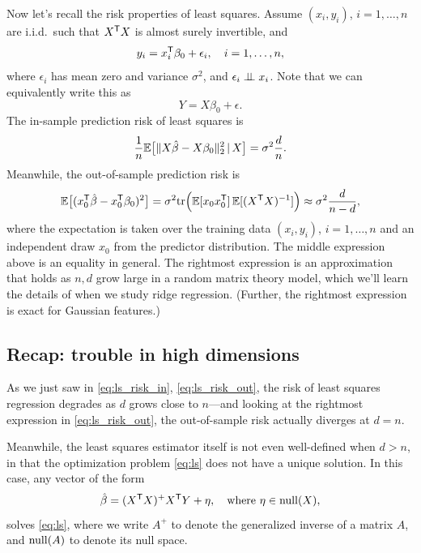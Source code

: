 \documentclass{article}
\begin{document}
Now let's recall the risk properties of least squares. Assume $(x_i,y_i)$,
$i=1,\dots,n$ are i.i.d.\ such that $X^{\mathsf{T}} X$ is almost surely invertible, and 
\[
y_i = x_i^{\mathsf{T}} \beta_0 + \epsilon_i, \quad i=1,\dots,n,
\]
where $\epsilon_i$ has mean zero and variance $\sigma^2$, and $\epsilon_i \perp\!\!\!\perp
x_i$. Note that we can equivalently write this as 
\begin{equation}
\label{eq:model}
Y = X\beta_0 + \epsilon.
\end{equation}
The in-sample prediction risk of least squares is
\begin{equation}
\label{eq:ls_risk_in}
\frac{1}{n} \mathbb{E} \big[ \| X\hat{\beta} - X\beta_0 \|_2^2 \,|\, X \big] = \sigma^2
\frac{d}{n}.  
\end{equation}
Meanwhile, the out-of-sample prediction risk is
\begin{equation}
\label{eq:ls_risk_out}
\mathbb{E} \big[ (x_0^{\mathsf{T}}\hat{\beta} - x_0^{\mathsf{T}}\beta_0 )^2 \big] = \sigma^2 \mathrm{tr}\Big(\mathbb{E} [x_0
x_0^{\mathsf{T}}] \, \mathbb{E} [(X^{\mathsf{T}} X)^{-1}] \Big) \approx \sigma^2 \frac{d}{n-d},
\end{equation}
where the expectation is taken over the training data $(x_i,y_i)$, $i=1,\dots,n$
and an independent draw $x_0$ from the predictor distribution.  The middle 
expression above is an equality in general. The rightmost expression is an
approximation that holds as $n,d$ grow large in a random matrix theory model,
which we'll learn the details of when we study ridge regression. (Further, the
rightmost expression is exact for Gaussian features.)

\subsection{Recap: trouble in high dimensions}

As we just saw in \eqref{eq:ls_risk_in}, \eqref{eq:ls_risk_out}, the risk of
least squares regression degrades as $d$ grows close to $n$---and looking at the
rightmost expression in \eqref{eq:ls_risk_out}, the out-of-sample risk actually
diverges at $d=n$.

Meanwhile, the least squares estimator itself is not even well-defined when $d >
n$, in that the optimization problem \eqref{eq:ls} does not have a unique
solution. In this case, any vector of the form 
\begin{equation}
\label{eq:ls_eta}
\hat{\beta} = (X^{\mathsf{T}} X)^+ X^{\mathsf{T}} Y + \eta, \quad \text{where $\eta \in \mathrm{null}(X)$},
\end{equation}
solves \eqref{eq:ls}, where we write $A^+$ to denote the generalized inverse of
a matrix $A$, and $\mathrm{null}(A)$ to denote its null space.
\end{document}
